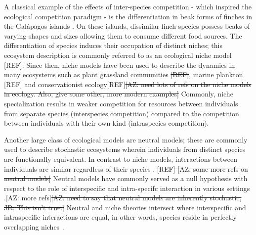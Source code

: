 \documentclass[9pt,twocolumn,twoside,lineno]{pnas-new}
\begin{document}
A classical example of the effects of inter-species competition - which inspired the ecological competition paradigm - is the differentiation in beak forms of finches in the Gal\'apagos islands \cite{lewin1983finches,lack1983darwin}. On these islands, dissimilar finch species possess beaks of varying shapes and sizes allowing them to consume different food sources. The differentiation of species induces their occupation of distinct niches; this ecosystem description is commonly referred to as an ecological niche model [REF]. 
Since then, niche models have been used to describe the dynamics in many ecosystems such as plant grassland communities \cite{zuppinger2014selection}\st{[REF]}, marine plankton [REF] and conservationist ecology[REF]\st{[AZ: need lots of refs on the niche models in ecology. Also, give some other, more modern examples]}
Commonly, niche specialization results in weaker competition for resources between individuals from separate species (interspecies competition) compared to the competition between individuals with their own kind (intraspecies competition).

Another large class of ecological models are neutral models; these are commonly used to describe stochastic ecosystems wherein individuals from distinct species are functionally equivalent. 
In contrast to niche models, interactions between individuals are similar regardless of their species  \cite{bell2001neutral,hubbell2001unified,chave2004neutral}. \st{[REF] [AZ: some more refs on neutral models]}
Neutral models have commonly served as a null hypothesis with respect to the role of interspecific and intra-specifc interaction in various settings \cite{bell2001neutral}.[AZ: more refs]\st{[AZ: need to say that neutral models are inherently stochastic, JR: This isn't true.]}
Neutral and niche theories intersect where interspecific and intraspecific interactions are equal, in other words, species reside in perfectly overlapping niches~\cite{grover1997resource,begon2006ecology,pocheville2015ecological}. 

\end{document}
